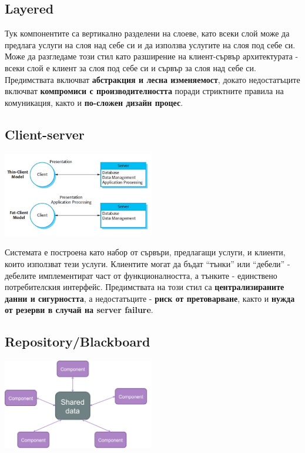 \documentclass[fleqn,12pt]{article}
\begin{document}
\subsection{Layered}
Тук компонентите са вертикално разделени на слоеве, като всеки слой може да предлага услуги на слоя над себе си и да използва услугите на слоя под себе си.
Може да разгледаме този стил като разширение на клиент-сървър архитектурата - всеки слой е клиент за слоя под себе си и сървър за слоя над себе си.
\bigbreak
Предимствата включват \textbf{абстракция и лесна изменяемост}, докато недостатъците включват \textbf{компромиси с производителността} поради стриктните правила на комуникация, както и \textbf{по-сложен дизайн процес}.

\subsection{Client-server}
\begin{center} \includegraphics[width=250px]{client_server.jpg} \end{center}

Системата е построена като набор от сървъри, предлагащи услуги, и клиенти, които използват тези услуги. Клиентите могат да бъдат “тънки” или “дебели” - дебелите имплементират част от функционалността, а тънките - единствено потребителския интерфейс.
\bigbreak
Предимствата на този стил са \textbf{централизираните данни и сигурността}, а недостатъците - \textbf{риск от претоварване}, както и \textbf{нужда от резерви в случай на server failure}.

\subsection{Repository/Blackboard}
\begin{center} \includegraphics[width=250px]{shared_memory.png} \end{center}
\end{document}

